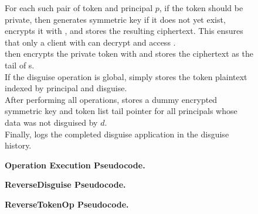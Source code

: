\begin{figure*}
{For each such pair of token and principal $p$, if the token should be private, then \sys generates symmetric key
  if it does not yet exist, encrypts it with , and stores the resulting ciphertext. 
    This ensures that only a client with  can decrypt and access . \\
\sys then encrypts the private token with  and stores the ciphertext as the tail of
    s.\\
    If the disguise operation is global, \sys simply stores the token plaintext indexed by principal and
    disguise.\\
    After performing all operations, \sys stores a dummy encrypted symmetric key and token list tail pointer for all
    principals whose data was not disguised by $d$.\\
    Finally, \sys logs the completed disguise application in the disguise history.
\label{fig:appdisg}
}
\end{figure*}

\begin{figure*}
\caption{\textbf{Operation Execution Pseudocode.}}
    \label{fig:opexec}
\end{figure*}

\begin{figure*}
\caption{\textbf{ReverseDisguise Pseudocode.}}
\label{fig:revdisg}
\end{figure*}

\begin{figure*}
\caption{\textbf{ReverseTokenOp Pseudocode.}}
    \label{fig:revtoken}
\end{figure*}

